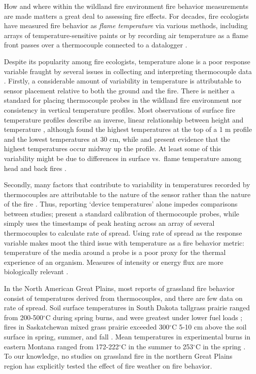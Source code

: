 \documentclass[referee, 
		     sn-basic]{sn-jnl}
\begin{document}
\begin{linenumbers}
How and where within the wildland fire environment fire behavior
measurements are made matters a great deal to assessing fire effects.
For decades, fire ecologists have measured fire behavior as \emph{flame
temperature} via various methods, including arrays of
temperature-sensitive paints
\citep[e.g.,][]{whittaker1961, smith1966, bailey1980} or by recording
air temperature as a flame front passes over a thermocouple connected to
a datalogger \citep[e.g.,][]{strong2013, russell2015}.

Despite its popularity among fire ecologists, temperature alone is a
poor response variable fraught by several issues in collecting and
interpreting thermocouple data \citep[see review by][]{mcgranahan2020}.
Firstly, a considerable amount of variability in temperature is
attributable to sensor placement relative to both the ground and the
fire. There is neither a standard for placing thermocouple probes in the
wildland fire environment nor consistency in vertical temperature
profiles. Most observations of surface fire temperature profiles
describe an inverse, linear relationship between height and temperature
\citep{smith1966, patten1984, archibold2003}, although
\citet{ramsay1996} found the highest temperatures at the top of a 1 m
profile and the lowest temperatures at 30 cm, while \citet{frost1987}
and \citet{bailey1980} present evidence that the highest temperatures
occur midway up the profile. At least some of this variability might be
due to differences in surface vs.~flame temperature among head and back
fires \citep{trollope1978}.

Secondly, many factors that contribute to variability in temperatures
recorded by thermocouples are attributable to the nature of the sensor
rather than the nature of the fire \citep[e.g.,][]{walker1968}. Thus,
reporting `device temperatures' alone impedes comparisons between
studies; \citet{bova2008} present a standard calibration of thermocouple
probes, while \citet{mcgranahan2021b} simply uses the timestamps of peak
heating across an array of several thermocouples to calculate rate of
spread. Using rate of spread as the response variable makes moot the
third issue with temperature as a fire behavior metric: temperature of
the media around a probe is a poor proxy for the thermal experience of
an organism. Measures of intensity or energy flux are more biologically
relevant \citep{kremens2012, smith2016}.

In the North American Great Plains, most reports of grassland fire
behavior consist of temperatures derived from thermocouples, and there
are few data on rate of spread. Soil surface temperatures in South
Dakota tallgrass prairie ranged from 200-500\(^\circ\)C during spring
burns, and were greatest under lower fuel loads \citep{ohrtman2015};
fires in Saskatchewan mixed grass prairie exceeded 300\(^\circ\)C 5-10
cm above the soil surface in spring, summer, and fall
\citep{archibold2003}. Mean temperatures in experimental burns in
eastern Montana ranged from 172-222\(^\circ\)C in the summer to 253\(^\circ\)C in the spring \citep{strong2013, russell2015}. To our
knowledge, no studies on grassland fire in the northern Great Plains
region has explicitly tested the effect of fire weather on fire
behavior.


\end{linenumbers}
\end{document}

